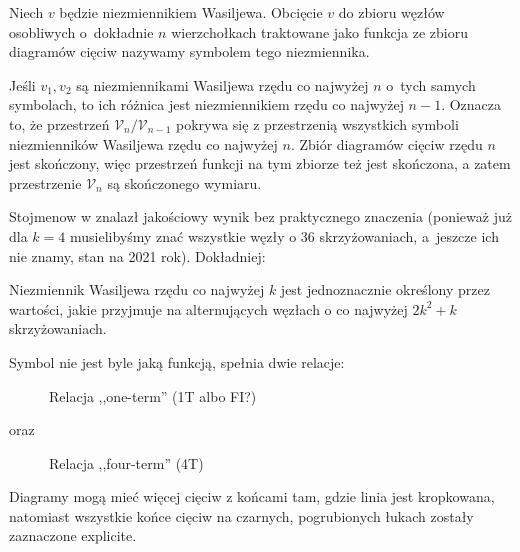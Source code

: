 \begin{definition}
%
    Niech $v$ będzie niezmiennikiem Wasiljewa.
    Obcięcie $v$ do zbioru węzłów osobliwych o~dokładnie $n$ wierzchołkach traktowane jako funkcja ze zbioru diagramów cięciw nazywamy symbolem tego niezmiennika.
\end{definition}

Jeśli $v_1, v_2$ są niezmiennikami Wasiljewa rzędu co najwyżej $n$ o~tych samych symbolach, to ich różnica jest niezmiennikiem rzędu co najwyżej $n - 1$.
Oznacza to, że przestrzeń $\mathcal V_n/\mathcal V_{n-1}$ pokrywa się z przestrzenią wszystkich symboli niezmienników Wasiljewa rzędu co najwyżej $n$.
Zbiór diagramów cięciw rzędu $n$ jest skończony, więc przestrzeń funkcji na tym zbiorze też jest skończona, a zatem przestrzenie $\mathcal V_n$ są skończonego wymiaru.

Stojmenow w \cite{stoimenow001} znalazł jakościowy wynik bez praktycznego znaczenia (ponieważ już dla $k = 4$ musielibyśmy znać wszystkie węzły o 36 skrzyżowaniach, a~jeszcze ich nie znamy, stan na 2021 rok).
%
Dokładniej:

\begin{proposition}
    Niezmiennik Wasiljewa rzędu co najwyżej $k$ jest jednoznacznie określony przez wartości, jakie przyjmuje na alternujących węzłach o co najwyżej $2k^2 + k$ skrzyżowaniach.
\end{proposition}

Symbol nie jest byle jaką funkcją, spełnia dwie relacje:
%
\begin{figure}[H]
\begin{comment}
    \[
        \LargeOneTerm \mapsto 0
    \]
\end{comment}
    \caption{Relacja ,,one-term'' (1T albo FI?)}
\end{figure}
oraz
\begin{figure}[H]
\begin{comment}
    \[
        \LargeFourTermA - \LargeFourTermB + \LargeFourTermC - \LargeFourTermD \mapsto 0.
    \]
\end{comment}
    \caption{Relacja ,,four-term'' (4T)}
\end{figure}

Diagramy mogą mieć więcej cięciw z końcami tam, gdzie linia jest kropkowana, natomiast wszystkie końce cięciw na czarnych, pogrubionych łukach zostały zaznaczone explicite.

